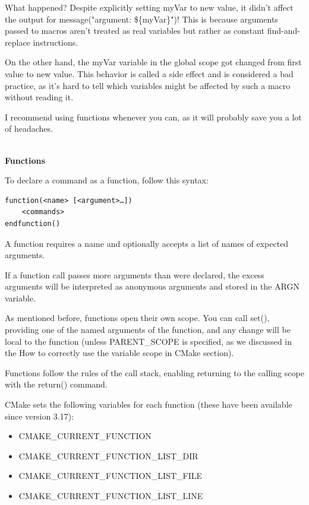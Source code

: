 What happened? Despite explicitly setting myVar to new value, it didn't affect the output for message("argument: \$\{myVar\}")! This is because arguments passed to macros aren't treated as real variables but rather as constant find-and-replace instructions.

On the other hand, the myVar variable in the global scope got changed from first value to new value. This behavior is called a side effect and is considered a bad practice, as it's hard to tell which variables might be affected by such a macro without reading it.

I recommend using functions whenever you can, as it will probably save you a lot of headaches.

\hspace*{\fill} \\ %
\noindent
\textbf{Functions}

To declare a command as a function, follow this syntax:

\begin{lstlisting}[style=styleCMake]
function(<name> [<argument>…])
	<commands>
endfunction()
\end{lstlisting}

A function requires a name and optionally accepts a list of names of expected arguments.

If a function call passes more arguments than were declared, the excess arguments will be interpreted as anonymous arguments and stored in the ARGN variable.

As mentioned before, functions open their own scope. You can call set(), providing one of the named arguments of the function, and any change will be local to the function (unless PARENT\_SCOPE is specified, as we discussed in the How to correctly use the variable scope in CMake section).

Functions follow the rules of the call stack, enabling returning to the calling scope with the return() command.

CMake sets the following variables for each function (these have been available since version 3.17):

\begin{itemize}
\item 
CMAKE\_CURRENT\_FUNCTION

\item 
CMAKE\_CURRENT\_FUNCTION\_LIST\_DIR

\item 
CMAKE\_CURRENT\_FUNCTION\_LIST\_FILE

\item 
CMAKE\_CURRENT\_FUNCTION\_LIST\_LINE
\end{itemize}

